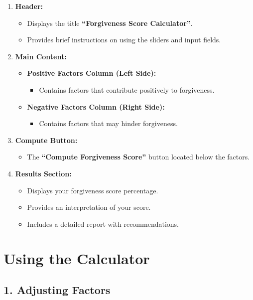 \documentclass[11pt]{article}
\begin{document}
\begin{enumerate}
    \item \textbf{Header:}
    \begin{itemize}
        \item Displays the title \textbf{``Forgiveness Score Calculator''}.
        \item Provides brief instructions on using the sliders and input fields.
    \end{itemize}
    \item \textbf{Main Content:}
    \begin{itemize}
        \item \textbf{Positive Factors Column (Left Side):}
        \begin{itemize}
            \item Contains factors that contribute positively to forgiveness.
        \end{itemize}
        \item \textbf{Negative Factors Column (Right Side):}
        \begin{itemize}
            \item Contains factors that may hinder forgiveness.
        \end{itemize}
    \end{itemize}
    \item \textbf{Compute Button:}
    \begin{itemize}
        \item The \textbf{``Compute Forgiveness Score''} button located below the factors.
    \end{itemize}
    \item \textbf{Results Section:}
    \begin{itemize}
        \item Displays your forgiveness score percentage.
        \item Provides an interpretation of your score.
        \item Includes a detailed report with recommendations.
    \end{itemize}
\end{enumerate}

\section*{Using the Calculator}

\subsection*{1. Adjusting Factors}
\end{document}
